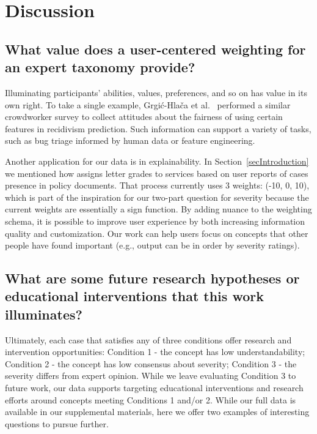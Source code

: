 \section{Discussion
}

\subsection{What value does a user-centered weighting for an expert taxonomy provide?}


Illuminating participants' abilities, values, preferences, and so on has value in its own right.
To take a single example, Grgić-Hlača et al.~\cite{GrgicHlaca2018fairness} performed a similar crowdworker survey to collect attitudes about the fairness of using certain features in recidivism prediction.
Such information can support a variety of tasks, such as bug triage informed by human data or feature engineering.


Another application for our data is in explainability.
In Section~\ref{secIntroduction} we mentioned how \tosdr{} assigns letter grades to services based on user reports of cases presence in policy documents.
That process currently uses 3 weights: (-10, 0, 10), which is part of the inspiration for our two-part question for severity because the current weights are essentially a sign function.
By adding nuance to the weighting schema, it is possible to improve user experience by both increasing information quality and customization.
Our work can help users focus on concepts that other people have found important (e.g., output can be in order by severity ratings).

\subsection{What are some future research hypotheses or educational interventions that this work illuminates?}


Ultimately, each case that satisfies any of three conditions offer research and intervention opportunities:
Condition 1 - the concept has low understandability;
Condition 2 - the concept has low consensus about severity;
Condition 3 - the severity differs from expert opinion.
While we leave evaluating Condition 3 to future work, our data supports targeting educational interventions and research efforts around concepts meeting Conditions 1 and/or 2.
While our full data is available in our supplemental materials, here we offer two examples of interesting questions to pursue further.

